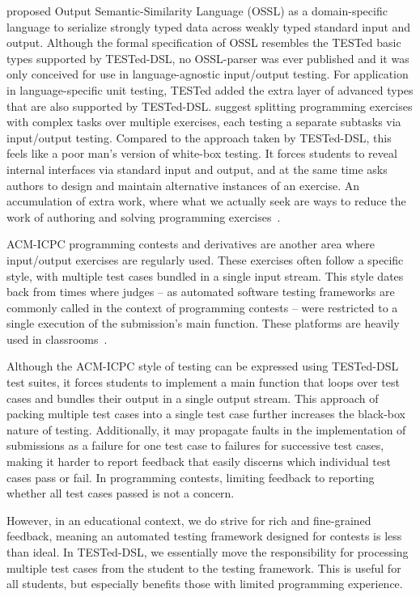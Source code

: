 \documentclass[../main]{subfiles}
\begin{document}
\Textcite{fonteFlexibleDynamicSystem2013} proposed Output Semantic-Similarity Language (OSSL) as a domain-specific language to serialize strongly typed data across weakly typed standard input and output.
Although the formal specification of OSSL resembles the TESTed basic types supported by TESTed-DSL, no OSSL-parser was ever published and it was only conceived for use in language-agnostic input/output testing.
For application in language-specific unit testing, TESTed added the extra layer of advanced types that are also supported by TESTed-DSL\@.
\Textcite{enstromFiveYearsKattis2011} suggest splitting programming exercises with complex tasks over multiple exercises, each testing a separate subtasks via input/output testing.
Compared to the approach taken by TESTed-DSL, this feels like a poor man's version of white-box testing.
It forces students to reveal internal interfaces via standard input and output, and at the same time asks authors to design and maintain alternative instances of an exercise.
An accumulation of extra work, where what we actually seek are ways to reduce the work of authoring and solving programming exercises~\autocite{douceAutomaticTestbasedAssessment2005}.

ACM-ICPC programming contests and derivatives are another area where input/output exercises are regularly used.
These exercises often follow a specific style, with multiple test cases bundled in a single input stream.
This style dates back from times where judges -- as automated software testing frameworks are commonly called in the context of programming contests -- were restricted to a single execution of the submission's main function.
These platforms are heavily used in classrooms~\autocite{wasikSurveyOnlineJudge2018,zinovievaUseOnlineCoding2021}.

Although the ACM-ICPC style of testing can be expressed using TESTed-DSL test suites, it forces students to implement a main function that loops over test cases and bundles their output in a single output stream.
This approach of packing multiple test cases into a single test case further increases the black-box nature of testing.
Additionally, it may propagate faults in the implementation of submissions as a failure for one test case to failures for successive test cases, making it harder to report feedback that easily discerns which individual test cases pass or fail.
In programming contests, limiting feedback to reporting whether all test cases passed is not a concern.

However, in an educational context, we do strive for rich and fine-grained feedback, meaning an automated testing framework designed for contests is less than ideal.
In TESTed-DSL, we essentially move the responsibility for processing multiple test cases from the student to the testing framework.
This is useful for all students, but especially benefits those with limited programming experience.
\end{document}
